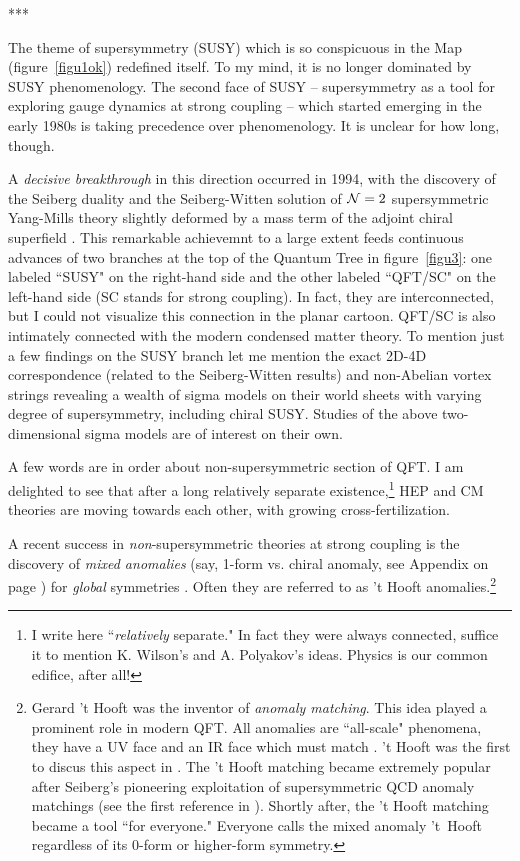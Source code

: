 \documentclass[epsfig,12pt]{article}
\begin{document}
\vspace{2mm}

\centerline{***}

The theme of supersymmetry (SUSY) which is so conspicuous in the Map (figure~$\!$\ref{figu1ok})
redefined itself. To my mind, it is no longer dominated by SUSY phenomenology. The second face of SUSY --  supersymmetry as a tool for exploring gauge dynamics at strong coupling -- which started emerging 
in the early 1980s \cite{NSVZ} is taking  precedence over phenomenology. It is unclear for how long, though. 

A {\em decisive breakthrough} in this direction occurred in 1994, with the discovery of the Seiberg duality and the Seiberg-Witten solution of 
${\cal N}=2$ supersymmetric Yang-Mills theory slightly deformed by a mass term of the adjoint chiral superfield \cite{sei}. 
This remarkable achievemnt to a large extent feeds continuous advances of two branches at the top of the Quantum Tree in figure~\ref{figu3}: one labeled ``SUSY" on the right-hand side and the other labeled ``QFT/SC" on the left-hand side (SC stands for strong coupling). In fact, they are interconnected, but I could not visualize this connection in the planar cartoon.  QFT/SC is also intimately connected with the modern condensed matter theory. 
To mention just a few findings on the SUSY branch let me mention the exact 2D-4D correspondence (related to the Seiberg-Witten results) and non-Abelian vortex strings revealing a wealth of sigma models on their world sheets with varying degree of supersymmetry, including chiral SUSY. Studies of the above two-dimensional sigma models are of interest on their own.

A few words are in order about non-supersymmetric section of QFT. I am delighted to see that after a long relatively separate existence,\footnote{I write here ``{\em relatively} separate." In fact they were always connected, suffice it to mention K. Wilson's and A. Polyakov's ideas. Physics is our common edifice, after all! } HEP and CM theories are moving towards each other, with growing cross-fertilization.

A recent success in {\em non}-supersymmetric theories at strong coupling is the discovery of {\em mixed anomalies} (say, 1-form vs. chiral anomaly, see Appendix on page \pageref{app}) for {\em global} symmetries \cite{K1,K2,K3}. Often they are referred to
as 't Hooft anomalies.\footnote{Gerard 't Hooft was the inventor of {\em anomaly matching}. This idea played a prominent role  in modern QFT.
All anomalies are  ``all-scale" phenomena, they have a UV face and an IR  face which must match \cite{shia}. 
 't Hooft was the first to discus this aspect  in \cite{tho}.
The 't Hooft matching became extremely popular after  Seiberg's pioneering exploitation 
of supersymmetric QCD anomaly matchings (see the first reference in \cite{sei}).  Shortly after, the 't Hooft matching 
became a tool ``for everyone."
Everyone calls the mixed anomaly 't~Hooft
regardless of its 0-form or higher-form symmetry.}
\end{document}
